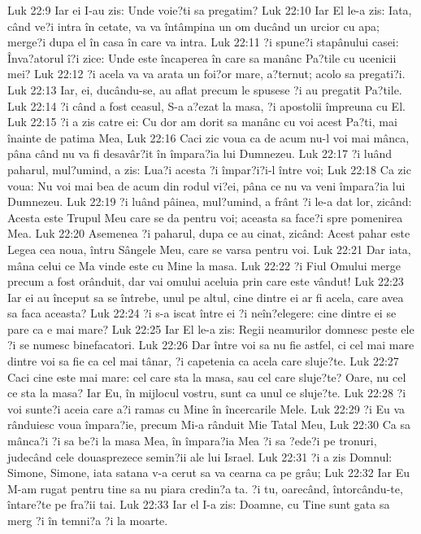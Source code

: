 Luk 22:9  Iar ei I-au zis: Unde voie?ti sa pregatim?
Luk 22:10  Iar El le-a zis: Iata, când ve?i intra în cetate, va va întâmpina un om ducând un urcior cu apa; merge?i dupa el în casa în care va intra.
Luk 22:11  ?i spune?i stapânului casei: Înva?atorul î?i zice: Unde este încaperea în care sa manânc Pa?tile cu ucenicii mei?
Luk 22:12  ?i acela va va arata un foi?or mare, a?ternut; acolo sa pregati?i.
Luk 22:13  Iar, ei, ducându-se, au aflat precum le spusese ?i au pregatit Pa?tile.
Luk 22:14  ?i când a fost ceasul, S-a a?ezat la masa, ?i apostolii împreuna cu El.
Luk 22:15  ?i a zis catre ei: Cu dor am dorit sa manânc cu voi acest Pa?ti, mai înainte de patima Mea,
Luk 22:16  Caci zic voua ca de acum nu-l voi mai mânca, pâna când nu va fi desavâr?it în împara?ia lui Dumnezeu.
Luk 22:17  ?i luând paharul, mul?umind, a zis: Lua?i acesta ?i împar?i?i-l între voi;
Luk 22:18  Ca zic voua: Nu voi mai bea de acum din rodul vi?ei, pâna ce nu va veni împara?ia lui Dumnezeu.
Luk 22:19  ?i luând pâinea, mul?umind, a frânt ?i le-a dat lor, zicând: Acesta este Trupul Meu care se da pentru voi; aceasta sa face?i spre pomenirea Mea.
Luk 22:20  Asemenea ?i paharul, dupa ce au cinat, zicând: Acest pahar este Legea cea noua, întru Sângele Meu, care se varsa pentru voi.
Luk 22:21  Dar iata, mâna celui ce Ma vinde este cu Mine la masa.
Luk 22:22  ?i Fiul Omului merge precum a fost orânduit, dar vai omului aceluia prin care este vândut!
Luk 22:23  Iar ei au început sa se întrebe, unul pe altul, cine dintre ei ar fi acela, care avea sa faca aceasta?
Luk 22:24  ?i s-a iscat între ei ?i neîn?elegere: cine dintre ei se pare ca e mai mare?
Luk 22:25  Iar El le-a zis: Regii neamurilor domnesc peste ele ?i se numesc binefacatori.
Luk 22:26  Dar între voi sa nu fie astfel, ci cel mai mare dintre voi sa fie ca cel mai tânar, ?i capetenia ca acela care sluje?te.
Luk 22:27  Caci cine este mai mare: cel care sta la masa, sau cel care sluje?te? Oare, nu cel ce sta la masa? Iar Eu, în mijlocul vostru, sunt ca unul ce sluje?te.
Luk 22:28  ?i voi sunte?i aceia care a?i ramas cu Mine în încercarile Mele.
Luk 22:29  ?i Eu va rânduiesc voua împara?ie, precum Mi-a rânduit Mie Tatal Meu,
Luk 22:30  Ca sa mânca?i ?i sa be?i la masa Mea, în împara?ia Mea ?i sa ?ede?i pe tronuri, judecând cele douasprezece semin?ii ale lui Israel.
Luk 22:31  ?i a zis Domnul: Simone, Simone, iata satana v-a cerut sa va cearna ca pe grâu;
Luk 22:32  Iar Eu M-am rugat pentru tine sa nu piara credin?a ta. ?i tu, oarecând, întorcându-te, întare?te pe fra?ii tai.
Luk 22:33  Iar el I-a zis: Doamne, cu Tine sunt gata sa merg ?i în temni?a ?i la moarte.
